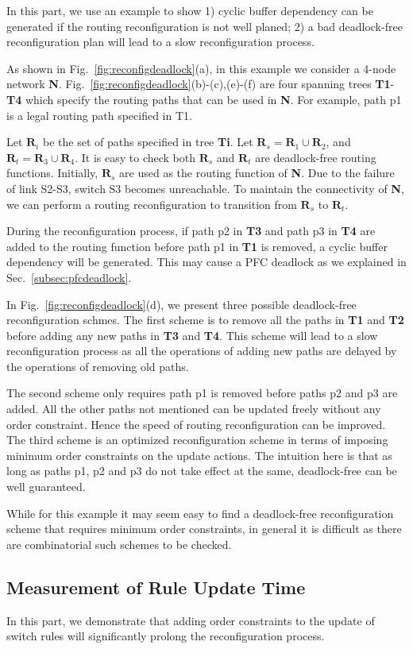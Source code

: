 In this part, we use an example to show 1) cyclic buffer dependency can be generated if the routing reconfiguration is not well planed; 2) a bad deadlock-free reconfiguration plan will lead to a slow reconfiguration process.

As shown in Fig.~\ref{fig:reconfigdeadlock}(a), in this example we consider a 4-node network \textbf{N}. Fig.~\ref{fig:reconfigdeadlock}(b)-(c),(e)-(f) are four spanning trees \textbf{T1}-\textbf{T4} which specify the routing paths that can be used in \textbf{N}. For example, path p1 is a legal routing path specified in T1.  

Let $\textbf{R}_i$ be the set of paths specified in tree \textbf{Ti}. Let $\textbf{R}_s = \textbf{R}_1 \cup \textbf{R}_2$, and $\textbf{R}_t = \textbf{R}_3 \cup \textbf{R}_4$. It is easy to check both $\textbf{R}_s$ and $\textbf{R}_t$ are deadlock-free routing functions. Initially,  $\textbf{R}_s$ are used as the routing function of \textbf{N}. Due to the failure of link S2-S3, switch S3 becomes unreachable. To maintain the connectivity of \textbf{N}, we can perform a routing reconfiguration to transition from $\textbf{R}_s$ to $\textbf{R}_t$.

During the reconfiguration process, if path p2 in \textbf{T3} and path p3 in \textbf{T4} are added to the routing function before path p1 in \textbf{T1} is removed, a cyclic buffer dependency will be generated. This may cause a PFC deadlock as we explained in Sec.~\ref{subsec:pfcdeadlock}.

In Fig.~\ref{fig:reconfigdeadlock}(d), we present three possible deadlock-free reconfiguration schmes. The first scheme is to remove all the paths in \textbf{T1} and \textbf{T2} before adding any new paths in \textbf{T3} and \textbf{T4}. This scheme will lead to a slow reconfiguration process as all the operations of adding new paths are delayed by the operations of removing old paths. 

The second scheme only requires path p1 is removed before paths p2 and p3 are added. All the other paths not mentioned can be updated freely without any order constraint. Hence the speed of routing reconfiguration can be improved. The third scheme is an optimized reconfiguration scheme in terms of imposing minimum order constraints on the update actions. The intuition here is that as long as paths p1, p2 and p3 do not take effect at the same, deadlock-free can be well guaranteed. 

While for this example it may seem easy to find a deadlock-free reconfiguration scheme that requires minimum order constraints, in general it is difficult as there are combinatorial such schemes to be checked.


\subsection{Measurement of Rule Update Time}\label{subsec:updatetime}

In this part, we demonstrate that adding order constraints to the update of switch rules will significantly prolong the reconfiguration process.
